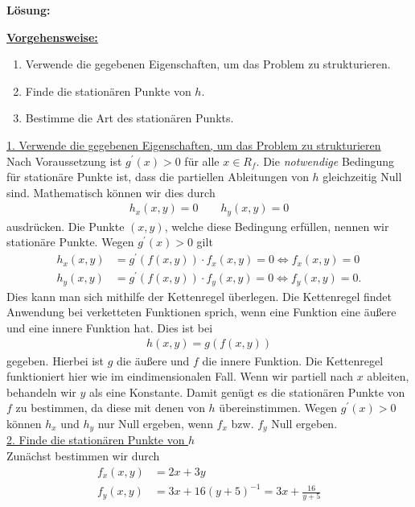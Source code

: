 \textbf{Lösung:}
\begin{mdframed}
\underline{\textbf{Vorgehensweise:}}
\renewcommand{\labelenumi}{\theenumi.}
\begin{enumerate}
\item Verwende die gegebenen Eigenschaften, um das Problem zu strukturieren.
\item Finde die stationären Punkte von $h$.
\item Bestimme die Art des stationären Punkts.
\end{enumerate}
\end{mdframed}

\underline{1. Verwende die gegebenen Eigenschaften, um das Problem zu strukturieren}\\
Nach Voraussetzung ist $g^\prime(x) > 0$ für alle $x \in R_f$.
Die \textit{notwendige} Bedingung für stationäre Punkte ist, dass die partiellen Ableitungen von $h$ gleichzeitig Null sind.
Mathematisch können wir dies durch
\begin{align*}
h_x(x, y) = 0 \qquad 
h_y(x, y) = 0
\end{align*}
ausdrücken.
Die Punkte $(x, y)$, welche diese Bedingung erfüllen, nennen wir stationäre Punkte.
Wegen $g^\prime(x) > 0 $ gilt
\begin{align*}
h_x(x, y) &=  g^\prime(f(x,y)) \cdot f_x(x,y) = 0
\Leftrightarrow
f_x(x,y) = 0\\
h_y(x,y) &= g^\prime(f(x,y)) \cdot f_y(x,y) = 0 
\Leftrightarrow
f_y(x,y) = 0.
\end{align*}
Dies kann man sich mithilfe der Kettenregel überlegen.
Die Kettenregel findet Anwendung bei verketteten Funktionen sprich, wenn eine Funktion eine äußere und eine innere Funktion hat.
Dies ist bei 
\begin{align*}
h(x,y) = g(f(x,y)) 
\end{align*}
gegeben. Hierbei ist $g$ die äußere und $f$ die innere Funktion.
Die Kettenregel funktioniert hier wie im eindimensionalen Fall.
Wenn wir partiell nach $x$ ableiten, behandeln wir $y$ als eine Konstante.
Damit genügt es die stationären Punkte von $f$ zu bestimmen, da diese mit denen von $h$ übereinstimmen.
Wegen $g^\prime(x) > 0 $ können $h_x$ und $h_y$ nur Null ergeben, wenn $f_x$ bzw. $f_y$ Null ergeben.\\
\newpage
\underline{2. Finde die stationären Punkte von $h$}\\
Zunächst bestimmen wir durch
\begin{equation*}
\begin{split}
f_x(x,y) &= 2x + 3y \\
f_y(x,y) &= 3x + 16 (y+5)^{-1} = 3x + \frac{16}{y+5}
\end{split}
\end{equation*}
